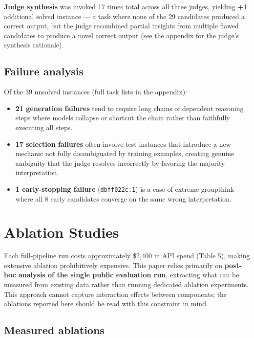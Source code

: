 \documentclass[10pt]{article}
\providecommand{\tightlist}{%
  \setlength{\itemsep}{0pt}\setlength{\parskip}{0pt}}
\begin{document}
\textbf{Judge synthesis} was invoked 17 times total across all three
judges, yielding \textbf{+1} additional solved instance --- a task where
none of the 29 candidates produced a correct output, but the judge
recombined partial insights from multiple flawed candidates to produce a
novel correct output (see the appendix for the judge's synthesis
rationale).

\hypertarget{failure-analysis}{%
\subsection{Failure analysis}\label{failure-analysis}}

Of the 39 unsolved instances (full task lists in the appendix):

\begin{itemize}
\tightlist
\item
  \textbf{21 generation failures} tend to require long chains of
  dependent reasoning steps where models collapse or shortcut the chain
  rather than faithfully executing all steps.
\item
  \textbf{17 selection failures} often involve test instances that
  introduce a new mechanic not fully disambiguated by training examples,
  creating genuine ambiguity that the judge resolves incorrectly by
  favoring the majority interpretation.
\item
  \textbf{1 early-stopping failure} (\texttt{dbff022c:1}) is a case of
  extreme groupthink where all 8 early candidates converge on the same
  wrong interpretation.
\end{itemize}

\hypertarget{ablation-studies}{%
\section{Ablation Studies}\label{ablation-studies}}

Each full-pipeline run costs approximately \$2,400 in API spend (Table
5), making extensive ablation prohibitively expensive. This paper relies
primarily on \textbf{post-hoc analysis of the single public evaluation
run}, extracting what can be measured from existing data rather than
running dedicated ablation experiments. This approach cannot capture
interaction effects between components; the ablations reported here
should be read with this constraint in mind.

\hypertarget{measured-ablations}{%
\subsection{Measured ablations}\label{measured-ablations}}
\end{document}
